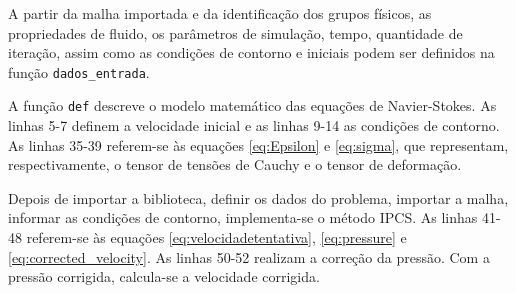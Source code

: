 A partir da malha importada e da identificação dos grupos físicos, as propriedades de fluido, os parâmetros de simulação, tempo, quantidade de iteração, assim como as condições de contorno e iniciais podem ser definidos na função \texttt{dados\_entrada}.
\begin{comment}

\begin{lstlisting}[title=\phantom{}]
def dados_entrada(type_fluido):
    dados_problema = {'diametro_saida':40,
                      'Tempo': 10,
                      'grav':-9.85,
                      'num_steps': 40000}
                      
    dados_problema['velocidade_fluido_inflowX'] = 0
    dados_problema['velocidade_fluido_inflowY'] =
    -1000*(500*0.0381)/(900*0.04)
    dados_problema['dt'] =
    int(dados_problema['Tempo'])/int(dados_problema['num_steps'])
    
    colchao_lavador = {
        'nome': "colchao_lavador",
        'viscosidade': 38.1,
        'densidade': 0.000900
    }

    dados_fluidos = [colchao_lavador]
    return dados_fluidos[type_fluido - 1], dados_problema
\end{lstlisting}
    
\end{comment}

A função \texttt{def} descreve o modelo matemático das equações de Navier-Stokes. As linhas 5-7 definem a velocidade inicial e as linhas 9-14 as condições de contorno. %
As linhas 35-39 referem-se às equações \ref{eq:Epsilon} e \ref{eq:sigma}, que representam, respectivamente, o tensor de tensões de Cauchy e o tensor de deformação. 

Depois de importar a biblioteca, definir os dados do problema, importar a malha, informar as condições de contorno, implementa-se o método IPCS. As linhas 41-48 referem-se às equações \ref{eq:velocidadetentativa}, \ref{eq:pressure} e \ref{eq:corrected_velocity}. As linhas 50-52 realizam a correção da pressão. Com a pressão corrigida, calcula-se a velocidade corrigida.

